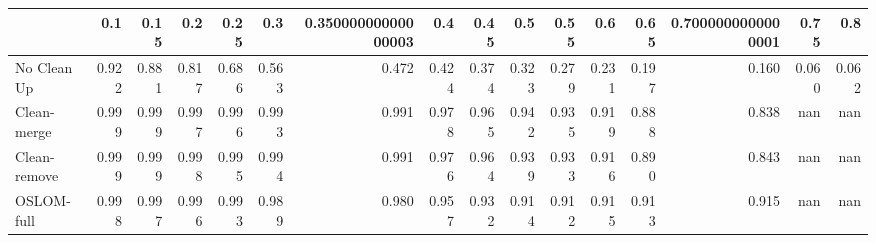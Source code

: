 \begin{tabular}{lrrrrrrrrrrrrrrr}
\toprule
{} &   0.1 &  0.15 &   0.2 &  0.25 &   0.3 & 0.35000000000000003 &   0.4 &  0.45 &   0.5 &  0.55 &   0.6 &  0.65 & 0.7000000000000001 &  0.75 &   0.8 \\
\midrule
No Clean Up  & 0.922 & 0.881 & 0.817 & 0.686 & 0.563 &               0.472 & 0.424 & 0.374 & 0.323 & 0.279 & 0.231 & 0.197 &              0.160 & 0.060 & 0.062 \\
Clean-merge  & 0.999 & 0.999 & 0.997 & 0.996 & 0.993 &               0.991 & 0.978 & 0.965 & 0.942 & 0.935 & 0.919 & 0.888 &              0.838 &   nan &   nan \\
Clean-remove & 0.999 & 0.999 & 0.998 & 0.995 & 0.994 &               0.991 & 0.976 & 0.964 & 0.939 & 0.933 & 0.916 & 0.890 &              0.843 &   nan &   nan \\
OSLOM-full   & 0.998 & 0.997 & 0.996 & 0.993 & 0.989 &               0.980 & 0.957 & 0.932 & 0.914 & 0.912 & 0.915 & 0.913 &              0.915 &   nan &   nan \\
\bottomrule
\end{tabular}
